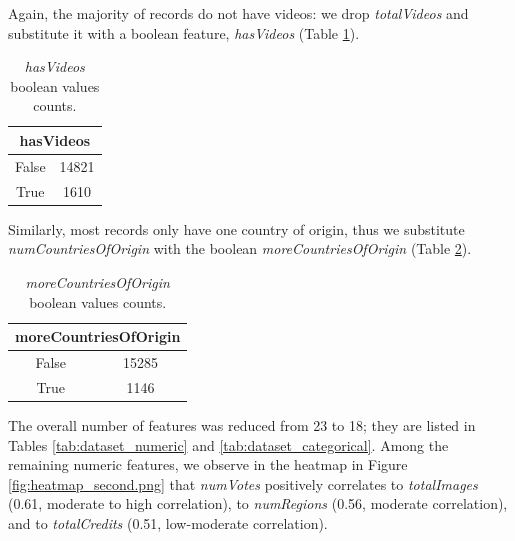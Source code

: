 Again, the majority of records do not have videos: we drop \textit{totalVideos} and substitute it with a boolean feature, \textit{hasVideos} (Table \ref{tab:hasVideos_bool}).
\begin{table}[h]
    \centering
    \renewcommand{\arraystretch}{1}
    \begin{tabular}{|c|c|}
        \hline
        \multicolumn{2}{|c|}{\textbf{hasVideos}} \\ \hline
        False & 14821 \\ \hline
        True  & 1610 \\ \hline
    \end{tabular}
    \caption{\textit{hasVideos} boolean values counts.}
    \label{tab:hasVideos_bool}
\end{table}

Similarly, most records only have one country of origin, thus we substitute \textit{numCountriesOfOrigin} with the boolean \textit{moreCountriesOfOrigin} (Table \ref{tab:moreCountriesOfOrigins_bool}).
\begin{table}[h]
    \centering
    \renewcommand{\arraystretch}{1}
    \begin{tabular}{|c|c|}
        \hline
        \multicolumn{2}{|c|}{\textbf{moreCountriesOfOrigin}} \\ \hline
        False & 15285 \\ \hline
        True  & 1146 \\ \hline
    \end{tabular}
    \caption{\textit{moreCountriesOfOrigin} boolean values counts.}
    \label{tab:moreCountriesOfOrigins_bool}
\end{table}

The overall number of features was reduced from 23 to 18; they are listed in Tables \ref{tab:dataset_numeric} and \ref{tab:dataset_categorical}. Among the remaining numeric features, we observe in the heatmap in Figure \ref{fig:heatmap_second.png} that \textit{numVotes} positively correlates to \textit{totalImages} (0.61, moderate to high correlation), to \textit{numRegions} (0.56, moderate correlation), and to \textit{totalCredits} (0.51, low-moderate correlation).

